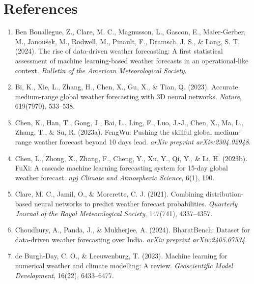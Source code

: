 \documentclass[12pt,a4paper,oneside]{report}
\begin{document}
\chapter{References}

\begin{enumerate}
    \item Ben Bouallegue, Z., Clare, M. C., Magnusson, L., Gascon, E., Maier-Gerber, M., Janoušek, M., Rodwell, M., Pinault, F., Dramsch, J. S., \& Lang, S. T. (2024). The rise of data-driven weather forecasting: A first statistical assessment of machine learning-based weather forecasts in an operational-like context. \textit{Bulletin of the American Meteorological Society}.

    \item Bi, K., Xie, L., Zhang, H., Chen, X., Gu, X., \& Tian, Q. (2023). Accurate medium-range global weather forecasting with 3D neural networks. \textit{Nature}, 619(7970), 533--538.

    \item Chen, K., Han, T., Gong, J., Bai, L., Ling, F., Luo, J.-J., Chen, X., Ma, L., Zhang, T., \& Su, R. (2023a). FengWu: Pushing the skillful global medium-range weather forecast beyond 10 days lead. \textit{arXiv preprint arXiv:2304.02948}.

    \item Chen, L., Zhong, X., Zhang, F., Cheng, Y., Xu, Y., Qi, Y., \& Li, H. (2023b). FuXi: A cascade machine learning forecasting system for 15-day global weather forecast. \textit{npj Climate and Atmospheric Science}, 6(1), 190.

    \item Clare, M. C., Jamil, O., \& Morcrette, C. J. (2021). Combining distribution-based neural networks to predict weather forecast probabilities. \textit{Quarterly Journal of the Royal Meteorological Society}, 147(741), 4337--4357.

    \item Choudhury, A., Panda, J., \& Mukherjee, A. (2024). BharatBench: Dataset for data-driven weather forecasting over India. \textit{arXiv preprint arXiv:2405.07534}.

    \item de Burgh-Day, C. O., \& Leeuwenburg, T. (2023). Machine learning for numerical weather and climate modelling: A review. \textit{Geoscientific Model Development}, 16(22), 6433--6477.


\end{enumerate}
\end{document}
